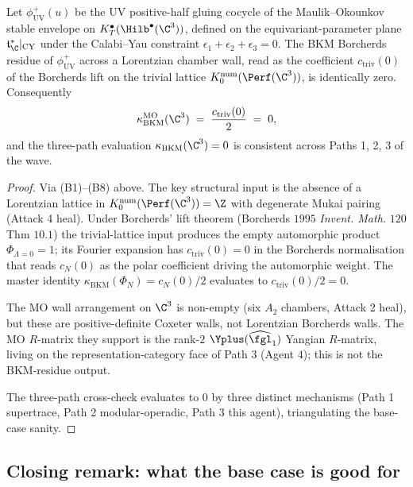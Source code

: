 \begin{theorem}
\label{thm:bl-mo-c3-vanishing-wave}
\ClaimStatusProvedHere
Let $\phi^+_{\mathrm{UV}}(u)$ be the UV positive-half gluing cocycle
of the Maulik--Okounkov stable envelope on $K_T^\bullet(\Hilb^\bullet
(\C^3))$, defined on the equivariant-parameter plane
$\mathfrak t^*_\C|_{\mathrm{CY}}$ under the Calabi--Yau constraint
$\epsilon_1 + \epsilon_2 + \epsilon_3 = 0$. The BKM Borcherds
residue of $\phi^+_{\mathrm{UV}}$ across a Lorentzian chamber wall,
read as the coefficient $c_{\mathrm{triv}}(0)$ of the Borcherds
lift on the trivial lattice $K_0^{\mathrm{num}}(\Perf(\C^3))$, is
identically zero. Consequently
\[
 \kappa_{\mathrm{BKM}}^{\mathrm{MO}}(\C^3) \;=\;
 \frac{c_{\mathrm{triv}}(0)}{2} \;=\; 0,
\]
and the three-path evaluation
$\kappa_{\mathrm{BKM}}(\C^3) = 0$ is consistent across Paths 1, 2, 3
of the wave.
\end{theorem}

\begin{proof}
Via (B1)--(B8) above. The key structural input is the absence of a
Lorentzian lattice in $K_0^{\mathrm{num}}(\Perf(\C^3)) = \Z$ with
degenerate Mukai pairing (Attack 4 heal). Under Borcherds' lift
theorem (Borcherds $1995$ \textit{Invent. Math.} $120$ Thm $10.1$)
the trivial-lattice input produces the empty automorphic product
$\Phi_{\Lambda = 0} = 1$; its Fourier expansion has
$c_{\mathrm{triv}}(0) = 0$ in the Borcherds normalisation that
reads $c_N(0)$ as the polar coefficient driving the automorphic
weight. The master identity
$\kappa_{\mathrm{BKM}}(\Phi_N) = c_N(0)/2$ evaluates to
$c_{\mathrm{triv}}(0)/2 = 0$.

The MO wall arrangement on $\C^3$ is non-empty (six $A_2$ chambers,
Attack 2 heal), but these are positive-definite Coxeter walls, not
Lorentzian Borcherds walls. The MO $R$-matrix they support is the
rank-$2$ $\Yplus(\widehat{\fgl}_1)$ Yangian $R$-matrix, living on
the representation-category face of Path 3 (Agent $4$); this is
not the BKM-residue output.

The three-path cross-check evaluates to $0$ by three distinct
mechanisms (Path 1 supertrace, Path 2 modular-operadic, Path 3
this agent), triangulating the base-case sanity.
\end{proof}

\subsection*{Closing remark: what the base case is good for}

